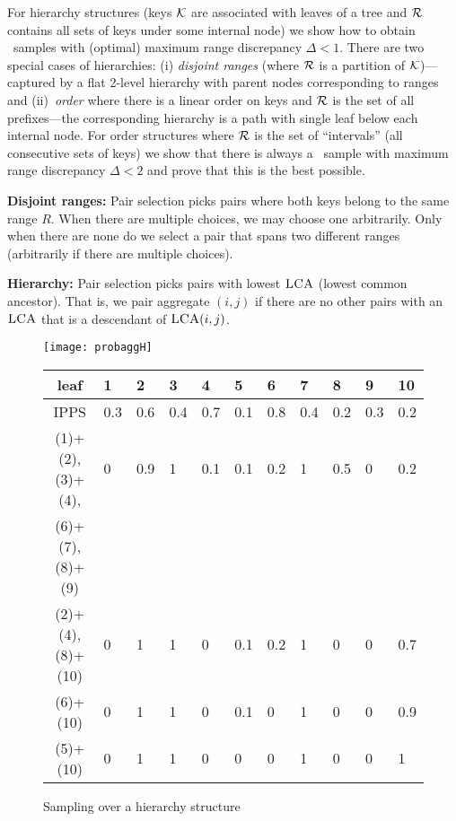 \documentclass[11pt]{article}
\begin{document}
For hierarchy structures
 (keys $\mathcal{K}$ are associated with leaves of a tree and $\mathcal{R}$ contains
all sets of keys under some internal node) we show how to obtain
\varopt\ samples with (optimal) maximum range discrepancy $\Delta <1$.
There are two special cases of hierarchies:
   (i) {\em disjoint ranges} (where
  $\mathcal{R}$ is a partition of $\mathcal{K}$)---captured by a flat 2-level 
hierarchy with parent nodes corresponding to ranges and
(ii)~{\em order} where there is a linear order on keys and 
$\mathcal{R}$ is the set of all prefixes---the corresponding 
hierarchy is a path with single leaf below each internal node.
For order structures  where $\mathcal{R}$ is the
set of ``intervals'' (all consecutive sets of keys) we show that there
is always a \varopt\ sample with maximum range discrepancy $\Delta<2$ and
prove that this is the best possible.


\label{drandhierarchy:sec}
\begin{list}{}{\leftmargin=1em}
\item
{\bf Disjoint ranges:}
Pair selection picks pairs where both keys belong to the same range $R$.  
When there are multiple choices, we may choose one arbitrarily.
Only when there are none do we
select a pair 
that spans two different ranges (arbitrarily if there are multiple
choices).


\item 
{\bf Hierarchy:}
   Pair selection picks pairs with lowest $\textnormal{\sc LCA}$ (lowest common ancestor).  
That is, we pair aggregate $(i,j)$ if there are no other pairs
with an $\textnormal{\sc LCA}$ that is a descendant of $\textnormal{\sc LCA}(i,j)$.  
\end{list}

\begin{figure}[t]
\centering
\texttt{[image: probaggH]}
\vspace{0.2in}

\centering
\begin{tabular}{c|llllllllll}
leaf & 1 & 2 & 3 & 4 & 5 & 6 & 7 & 8 & 9 & 10 \\
\hline
IPPS & 0.3 & 0.6 & 0.4 & 0.7 & 0.1 & 0.8 & 0.4 & 0.2 & 0.3 & 0.2 \\
\hline
(1)+(2),(3)+(4), & 0 & 0.9 & 1 & 0.1 & 0.1 & 0.2 & 1 & 0.5 & 0 & 0.2 \\
(6)+(7),(8)+(9) & \multicolumn{10}{c}{} \\
(2)+(4), (8)+(10) &  0 & 1 & 1 & 0 & 0.1 & 0.2 & 1 & 0 & 0 & 0.7 \\
(6)+(10) & 0 & 1 & 1 & 0 & 0.1 & 0 & 1 & 0 & 0 & 0.9 \\ 
(5)+(10) & 0 & 1 & 1 & 0 & 0 & 0 & 1 & 0 & 0 & 1 
\end{tabular}
\caption{Sampling over a hierarchy structure}
\label{probaggH:fig}
\end{figure}
\end{document}
